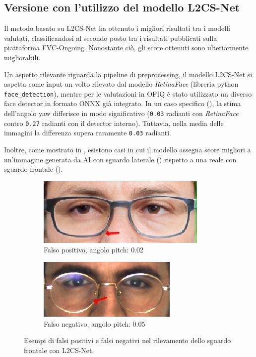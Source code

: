 \documentclass[12pt,a4paper,openright,twoside]{book}
\begin{document}
\subsection{Versione con l'utilizzo del modello L2CS-Net}
Il metodo basato su L2CS-Net ha ottenuto i migliori risultati tra i modelli valutati, classificandosi al secondo posto tra i risultati pubblicati sulla piattaforma FVC-Ongoing. Nonostante ciò, gli score ottenuti sono ulteriormente migliorabili.  

Un aspetto rilevante riguarda la pipeline di preprocessing, il modello L2CS-Net si aspetta come input un volto rilevato dal modello \textit{RetinaFace} (libreria python \texttt{face\_detection}), mentre per le valutazioni in OFIQ è stato utilizzato un diverso face detector in formato ONNX già integrato. In un caso specifico (), la stima dell'angolo yaw differisce in modo significativo (\texttt{0.03} radianti con \textit{RetinaFace} contro \texttt{0.27} radianti con il detector interno). Tuttavia, nella media delle immagini la differenza supera raramente \texttt{0.03} radianti.

Inoltre, come mostrato in , esistono casi in cui il modello assegna score migliori a un'immagine generata da AI con sguardo laterale () rispetto a una reale con sguardo frontale (). 

\begin{figure}[htbp]
    \centering
    \begin{subfigure}{0.49\textwidth}
        \includegraphics[width=.7\linewidth]{figures/frontal-gaze-l2cs-false-positive-97-1.png}
        \caption{Falso positivo, angolo pitch: 0.02}
        \label{fig:frontal_gaze_l2cs_false_positive}
    \end{subfigure}
    \hfill
    \begin{subfigure}{0.49\textwidth}
        \includegraphics[width=.7\linewidth]{figures/frontal-gaze-l2cs-false-negative-65-1.png}
        \caption{Falso negativo, angolo pitch: 0.05}
        \label{fig:frontal_gaze_l2cs_false_negative}
    \end{subfigure}
    \caption{Esempi di falsi positivi e falsi negativi nel rilevamento dello sguardo frontale con L2CS-Net.}
    \label{fig:frontal_gaze_l2cs_weakness}
\end{figure}
\end{document}
